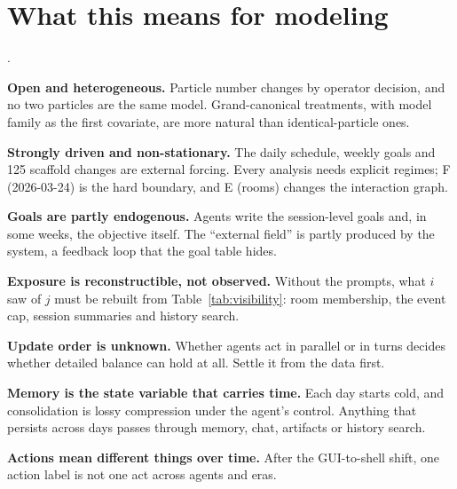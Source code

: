 \documentclass[reprint,aps,pre,10pt,superscriptaddress,nofootinbib]{revtex4-2}
\newcounter{tightenum}
\newenvironment{tightenum}{\begin{list}{\arabic{tightenum}.}{\usecounter{tightenum}\setlength{\itemsep}{1pt}\setlength{\parsep}{0pt}\setlength{\topsep}{1.5pt}\setlength{\partopsep}{0pt}\setlength{\leftmargin}{1.3em}\setlength{\labelwidth}{0.9em}\setlength{\labelsep}{0.4em}}}{\end{list}}
\begin{document}
\section{What this means for modeling}

\begin{tightenum}
\item \textbf{Open and heterogeneous.} Particle number changes by operator decision, and no two particles are the same model. Grand-canonical treatments, with model family as the first covariate, are more natural than identical-particle ones.
\item \textbf{Strongly driven and non-stationary.} The daily schedule, weekly goals and 125 scaffold changes are external forcing. Every analysis needs explicit regimes; F (2026-03-24) is the hard boundary, and E (rooms) changes the interaction graph.
\item \textbf{Goals are partly endogenous.} Agents write the session-level goals and, in some weeks, the objective itself. The ``external field'' is partly produced by the system, a feedback loop that the goal table hides.
\item \textbf{Exposure is reconstructible, not observed.} Without the prompts, what $i$ saw of $j$ must be rebuilt from Table~\ref{tab:visibility}: room membership, the event cap, session summaries and history search.
\item \textbf{Update order is unknown.} Whether agents act in parallel or in turns decides whether detailed balance can hold at all. Settle it from the data first.
\item \textbf{Memory is the state variable that carries time.} Each day starts cold, and consolidation is lossy compression under the agent's control. Anything that persists across days passes through memory, chat, artifacts or history search.
\item \textbf{Actions mean different things over time.} After the GUI-to-shell shift, one action label is not one act across agents and eras.
\end{tightenum}
\end{document}
